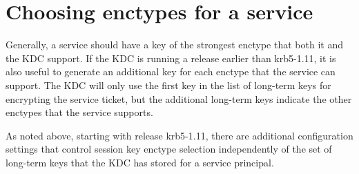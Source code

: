 \documentclass[letterpaper,10pt,english]{sphinxmanual}
\begin{document}
\section{Choosing enctypes for a service}
\label{\detokenize{admin/enctypes:choosing-enctypes-for-a-service}}
Generally, a service should have a key of the strongest
enctype that both it and the KDC support.  If the KDC is running a
release earlier than krb5-1.11, it is also useful to generate an
additional key for each enctype that the service can support.  The KDC
will only use the first key in the list of long-term keys for encrypting
the service ticket, but the additional long-term keys indicate the
other enctypes that the service supports.

As noted above, starting with release krb5-1.11, there are additional
configuration settings that control session key enctype selection
independently of the set of long-term keys that the KDC has stored for
a service principal.
\end{document}
